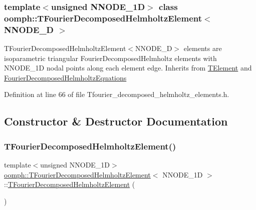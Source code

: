 \subsubsection*{template$<$unsigned N\+N\+O\+D\+E\+\_\+1D$>$\newline
class oomph\+::\+T\+Fourier\+Decomposed\+Helmholtz\+Element$<$ N\+N\+O\+D\+E\+\_\+D $>$}

T\+Fourier\+Decomposed\+Helmholtz\+Element$<$\+N\+N\+O\+D\+E\+\_\+D$>$ elements are isoparametric triangular Fourier\+Decomposed\+Helmholtz elements with N\+N\+O\+D\+E\+\_\+1D nodal points along each element edge. Inherits from \hyperlink{classoomph_1_1TElement}{T\+Element} and \hyperlink{classoomph_1_1FourierDecomposedHelmholtzEquations}{Fourier\+Decomposed\+Helmholtz\+Equations} 

Definition at line 66 of file Tfourier\+\_\+decomposed\+\_\+helmholtz\+\_\+elements.\+h.



\subsection{Constructor \& Destructor Documentation}
\mbox{\label{classoomph_1_1TFourierDecomposedHelmholtzElement_aaf727b0a259c73f1622c5c7ea3cff902}} 
\subsubsection{\texorpdfstring{T\+Fourier\+Decomposed\+Helmholtz\+Element()}{TFourierDecomposedHelmholtzElement()}\hspace{0.1cm}{\footnotesize\ttfamily [1/2]}}
{\footnotesize\ttfamily template$<$unsigned N\+N\+O\+D\+E\+\_\+1D$>$ \\
\hyperlink{classoomph_1_1TFourierDecomposedHelmholtzElement}{oomph\+::\+T\+Fourier\+Decomposed\+Helmholtz\+Element}$<$ N\+N\+O\+D\+E\+\_\+1D $>$\+::\hyperlink{classoomph_1_1TFourierDecomposedHelmholtzElement}{T\+Fourier\+Decomposed\+Helmholtz\+Element} (\begin{DoxyParamCaption}{ }\end{DoxyParamCaption})\hspace{0.3cm}{\ttfamily [inline]}}



